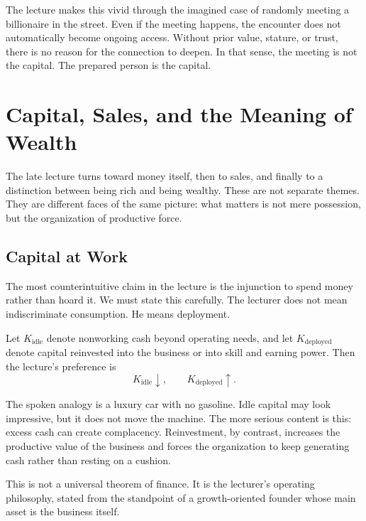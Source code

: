 The lecture makes this vivid through the imagined case of randomly meeting a billionaire in the street. Even if the meeting happens, the encounter does not automatically become ongoing access. Without prior value, stature, or trust, there is no reason for the connection to deepen. In that sense, the meeting is not the capital. The prepared person is the capital.

\section{Capital, Sales, and the Meaning of Wealth}

The late lecture turns toward money itself, then to sales, and finally to a distinction between being rich and being wealthy. These are not separate themes. They are different faces of the same picture: what matters is not mere possession, but the organization of productive force.

\subsection{Capital at Work}

The most counterintuitive claim in the lecture is the injunction to spend money rather than hoard it. We must state this carefully. The lecturer does not mean indiscriminate consumption. He means deployment.

Let \(K_{\text{idle}}\) denote nonworking cash beyond operating needs, and let \(K_{\text{deployed}}\) denote capital reinvested into the business or into skill and earning power. Then the lecture's preference is
\begin{equation}
K_{\text{idle}}\downarrow,\qquad K_{\text{deployed}}\uparrow.
\end{equation}

The spoken analogy is a luxury car with no gasoline. Idle capital may look impressive, but it does not move the machine. The more serious content is this: excess cash can create complacency. Reinvestment, by contrast, increases the productive value of the business and forces the organization to keep generating cash rather than resting on a cushion.

\begin{remark}
This is not a universal theorem of finance. It is the lecturer's operating philosophy, stated from the standpoint of a growth-oriented founder whose main asset is the business itself.
\end{remark}

